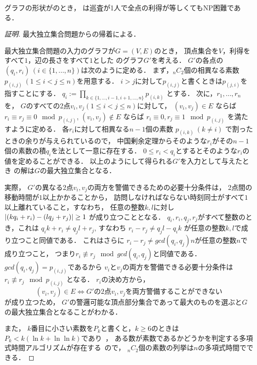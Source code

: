 \begin{theo}
\label{theo:unit_exacidletime_NPhard}
グラフの形状が{\graphUnit}のとき，
{\timeSpecifiedPatProb}は巡査が1人で全点の利得が等しくてもNP困難である．
\end{theo}
\begin{proof}[証明]
最大独立集合問題からの帰着による．

\newcommand{\primenum}[2]{p_{(#1,#2)}}
最大独立集合問題の入力のグラフが$G = (V, E)$のとき，
頂点集合を$V$，利得をすべて$1$，辺の長さをすべて$1$とした
{\graphUnit}のグラフ$G'$を考える．
$G'$の各点の{\exactIdletime}$(q_i, r_i)\ (i \in \{ 1, \ldots, n \})$は次のように定める．
まず，${}_n C_2$個の相異なる素数$\primenum{i}{j}\ (1 \leq i < j \leq n)$を用意する．
$i > j$に対して$\primenum{i}{j}$と書くときは$\primenum{j}{i}$を指すことにする．
$q_i := \prod_{k \in \{ 1, \ldots, i - 1, i + 1, \ldots, n\} } \primenum{i}{k}$
とする．
次に，$r_1, \ldots, r_n$を，
$G$のすべての2点$v_i, v_j (1 \leq i < j \leq n)$に対して，
$(v_i, v_j) \in E$     ならば $r_i \equiv    r_j \equiv 0 \mod \primenum{i}{j}$,
$(v_i, v_j) \not\in E$ ならば $r_i \equiv 0, r_j \equiv 1 \mod \primenum{i}{j}$
を満たすように定める．
各$r_i$に対して相異なる$n - 1$個の素数
$\primenum{i}{k}\ (k \neq i)$
で割ったときの余りが与えられているので，
中国剰余定理からそのような$r_i$がその$n - 1$個の素数の積$q_i$を法として一意に存在する．
$0 \leq r_i < q_i$とするとそのような$r_i$の値を定めることができる．
以上のようにして得られる$G'$を入力として与えたとき
{\timeSpecifiedPatProb}の解は$G$の最大独立集合となる．

実際，
$G'$の異なる2点$v_i, v_j$の両方を警備できるための必要十分条件は，
2点間の移動時間が$1$以上かかることから，
訪問しなければならない時刻同士がすべて$1$以上離れていること，すなわち，
任意の整数$k, l$に対し$\lvert{(k q_i + r_i) - (l q_j + r_j)}\rvert \geq 1$
が成り立つこととなる．
$q_i, r_i, q_j, r_j$がすべて整数のとき，これは
$q_i k + r_i \neq q_j l + r_j$, 
すなわち
$r_i - r_j \neq q_j l - q_i k$
が任意の整数$k, l$で成り立つこと同値である．
これはさらに
$r_i - r_j \neq gcd(q_i,q_j) n$が任意の整数$n$で成り立つこと，
つまり$r_i \not\equiv r_j \mod gcd(q_i, q_j)$と同値である．
$gcd(q_i, q_j) = \primenum{i}{j}$であるから
$v_i$と$v_j$の両方を警備できる必要十分条件は
$r_i \not\equiv r_j \mod \primenum{i}{j}$
となる．
$r_i$の決め方から，
\[
  (v_i, v_j) \in E \iff \text{$G'$の2点$v_i, v_j$を両方警備することができない}
\]
が成り立つため，
$G'$の警邏可能な頂点部分集合であって最大のものを選ぶと$G$の最大独立集合となることがわかる．

また，
$k$番目に小さい素数を$P_k$と書くと，$k \geq 6$のときは
$P_k < k( \ln k + \ln\ln k )$であり~\cite{dusart1999k}，
ある数が素数であるかどうかを判定する多項式時間アルゴリズムが存在する~\cite{agrawal2004primes}ので，
${}_n C_2$個の素数の列挙は$n$の多項式時間でできる．
\end{proof}





